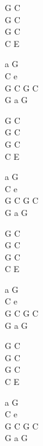 \begin{chord}
G C\\
G C\\
G C\\
C E

a G\\
C e\\
G C G C\\
G a G

G C\\
G C\\
G C\\
C E

a G\\
C e\\
G C G C\\
G a G

G C\\
G C\\
G C\\
C E

a G\\
C e\\
G C G C\\
G a G

G C\\
G C\\
G C\\
C E

a G\\
C e\\
G C G C\\
G a G
\end{chord}